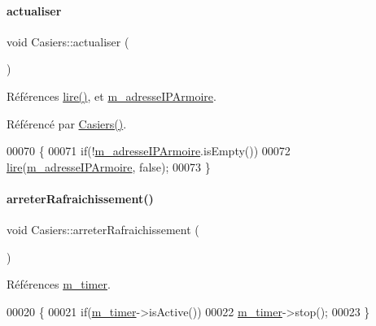 \paragraph{\texorpdfstring{actualiser}{actualiser}}
{\footnotesize\ttfamily void Casiers\+::actualiser (\begin{DoxyParamCaption}{ }\end{DoxyParamCaption})\hspace{0.3cm}{\ttfamily [slot]}}



Références \hyperlink{class_casiers_a7b1d58f40217ef13a5dd0d966df38c9a}{lire()}, et \hyperlink{class_casiers_af745ce1cdce8dce725444e19437e0155}{m\+\_\+adresse\+I\+P\+Armoire}.



Référencé par \hyperlink{class_casiers_ae9620f81e704a989f37b5b86e779e3df}{Casiers()}.


\begin{DoxyCode}
00070 \{
00071     \textcolor{keywordflow}{if}(!\hyperlink{class_casiers_af745ce1cdce8dce725444e19437e0155}{m\_adresseIPArmoire}.isEmpty())
00072         \hyperlink{class_casiers_a7b1d58f40217ef13a5dd0d966df38c9a}{lire}(\hyperlink{class_casiers_af745ce1cdce8dce725444e19437e0155}{m\_adresseIPArmoire}, \textcolor{keyword}{false});
00073 \}
\end{DoxyCode}
\mbox{\label{class_casiers_ad9a69a4e68885d87318188102f57fdd6}} 
\paragraph{\texorpdfstring{arreter\+Rafraichissement()}{arreterRafraichissement()}}
{\footnotesize\ttfamily void Casiers\+::arreter\+Rafraichissement (\begin{DoxyParamCaption}{ }\end{DoxyParamCaption})}



Références \hyperlink{class_casiers_a2e2ee8b7f70d1c22acca56257d257ae6}{m\+\_\+timer}.


\begin{DoxyCode}
00020 \{
00021     \textcolor{keywordflow}{if}(\hyperlink{class_casiers_a2e2ee8b7f70d1c22acca56257d257ae6}{m\_timer}->isActive())
00022        \hyperlink{class_casiers_a2e2ee8b7f70d1c22acca56257d257ae6}{m\_timer}->stop();
00023 \}
\end{DoxyCode}
\mbox{\label{class_casiers_a3c23157572d06e973860c4d9f9589b1e}} 
